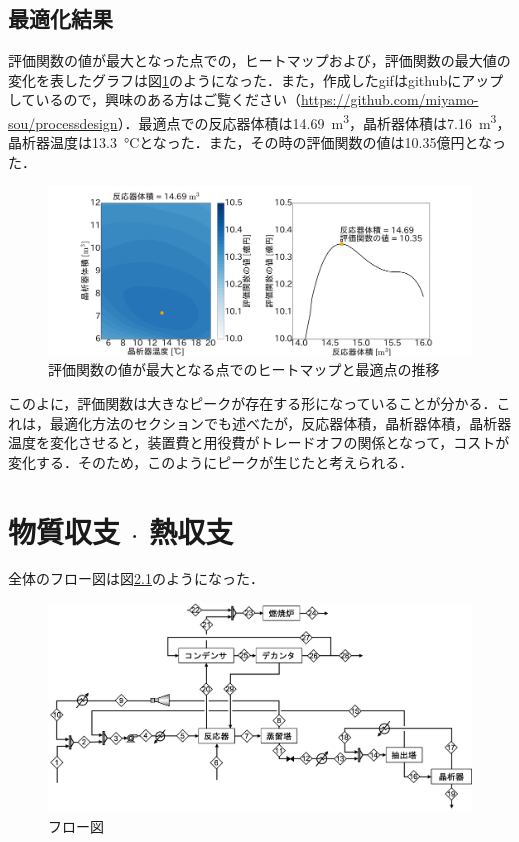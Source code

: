 \documentclass[a4j]{jsreport}
\begin{document}
\section{最適化結果}
評価関数の値が最大となった点での，ヒートマップおよび，評価関数の最大値の変化を表したグラフは図\ref{最適化結果}のようになった．また，作成したgifはgithubにアップしているので，興味のある方はご覧ください（\url{https://github.com/miyamo-sou/processdesign}）．最適点での反応器体積は14.69\, \si{\cubic \metre}，晶析器体積は7.16\, \si{\cubic \metre}，晶析器温度は13.3\, \si{\degreeCelsius}となった．また，その時の評価関数の値は10.35億円となった．
\begin{figure}[htbp]
  \centering
  \includegraphics[scale=0.1]{snapshot.png}
  \caption{評価関数の値が最大となる点でのヒートマップと最適点の推移}
  \label{最適化結果}
\end{figure}

このよに，評価関数は大きなピークが存在する形になっていることが分かる．これは，最適化方法のセクションでも述べたが，反応器体積，晶析器体積，晶析器温度を変化させると，装置費と用役費がトレードオフの関係となって，コストが変化する．そのため，このようにピークが生じたと考えられる．


\clearpage
\chapter{物質収支 $\cdot$ 熱収支}
全体のフロー図は図\ref{フロー図}のようになった．
\begin{figure}[htbp]
  \centering
  \includegraphics[scale=0.6]{mat_flow.png}
  \caption{フロー図}
  \label{フロー図}
\end{figure}
\end{document}
